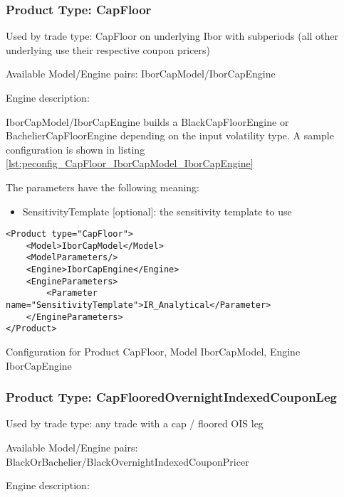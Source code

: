 \subsubsection{Product Type: CapFloor}

Used by trade type: CapFloor on underlying Ibor with subperiods (all other underlying use their respective coupon pricers)

Available Model/Engine pairs: IborCapModel/IborCapEngine

Engine description:

IborCapModel/IborCapEngine builds a BlackCapFloorEngine or BachelierCapFloorEngine depending on the input volatility
type. A sample configuration is shown in listing \ref{lst:peconfig_CapFloor_IborCapModel_IborCapEngine}

The parameters have the following meaning:

\begin{itemize}
\item SensitivityTemplate [optional]: the sensitivity template to use 
\end{itemize}

\begin{longlisting}
\begin{verbatim}
<Product type="CapFloor">
    <Model>IborCapModel</Model>
    <ModelParameters/>
    <Engine>IborCapEngine</Engine>
    <EngineParameters>
        <Parameter name="SensitivityTemplate">IR_Analytical</Parameter>
    </EngineParameters>
</Product>
\end{verbatim}
\caption{Configuration for Product CapFloor, Model IborCapModel, Engine IborCapEngine}
\label{lst:peconfig_lst:peconfig_CapFloor_IborCapModel_IborCapEngine}
\end{longlisting}

\subsubsection{Product Type: CapFlooredOvernightIndexedCouponLeg}

Used by trade type: any trade with a cap / floored OIS leg

Available Model/Engine pairs: BlackOrBachelier/BlackOvernightIndexedCouponPricer

Engine description:

